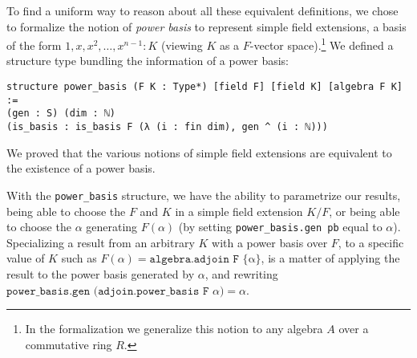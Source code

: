 \documentclass[a4paper,USenglish,cleveref, autoref, thm-restate]{lipics-v2021}
\newcommand{\lean}[1]{\texttt{#1}\xspace} %
\newcommand{\Q}{\mathbb{Q}}
\begin{document}

To find a uniform way to reason about all these equivalent definitions,
we chose to formalize the notion of \emph{power basis} to represent simple field extensions, a basis of the form $1, x, x^2, \dots, x^{n-1} : K$ (viewing $K$ as a $F$-vector space).\footnote{In the formalization we generalize this notion to any algebra $A$ over a commutative ring $R$.}
We defined a structure type bundling the information of a power basis:
\begin{lstlisting}
structure power_basis (F K : Type*) [field F] [field K] [algebra F K] :=
(gen : S) (dim : ℕ)
(is_basis : is_basis F (λ (i : fin dim), gen ^ (i : ℕ)))
\end{lstlisting}
We proved that the various notions of simple field extensions are equivalent to the existence of a power basis.


With the \lean{power\_basis} structure, we have the ability to parametrize our results,
being able to choose the $F$ and $K$ in a simple field extension $K / F$, or being able to choose the $\alpha$ generating $F(\alpha)$ (by setting \lean{power\_basis.gen\ pb} equal to $\alpha$). Specializing a result from an arbitrary $K$ with a power basis over $F$,
to a specific value of $K$ such as $F(\alpha) = \lean{algebra.adjoin F \{α\}}$, is a matter of applying the result to the power basis generated by $\alpha$, and rewriting $\lean{power\_basis.gen (adjoin.power\_basis F $\alpha$)} = \alpha$.
\end{document}
